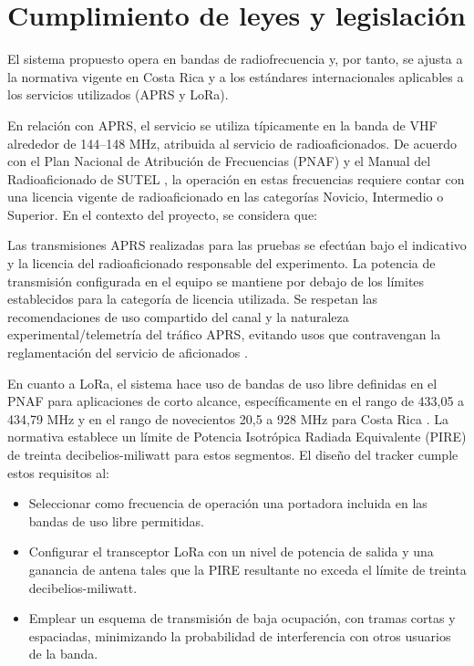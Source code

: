 \documentclass[journal]{IEEEtran}
\begin{document}
\section{Cumplimiento de leyes y legislación}

El sistema propuesto opera en bandas de radiofrecuencia y, por tanto, se ajusta a la normativa vigente en Costa Rica y a los estándares internacionales aplicables a los servicios utilizados (APRS y LoRa).

En relación con APRS, el servicio se utiliza típicamente en la banda de VHF alrededor de 144–148 MHz, atribuida al servicio de radioaficionados. De acuerdo con el Plan Nacional de Atribución de Frecuencias (PNAF) y el Manual del Radioaficionado de SUTEL \cite{sutel_manual_radioaficionados_2014}, la operación en estas frecuencias requiere contar con una licencia vigente de radioaficionado en las categorías Novicio, Intermedio o Superior. En el contexto del proyecto, se considera que:

Las transmisiones APRS realizadas para las pruebas se efectúan bajo el indicativo y la licencia del radioaficionado responsable del experimento.
La potencia de transmisión configurada en el equipo se mantiene por debajo de los límites establecidos para la categoría de licencia utilizada.
Se respetan las recomendaciones de uso compartido del canal y la naturaleza experimental/telemetría del tráfico APRS, evitando usos que contravengan la reglamentación del servicio de aficionados \cite{micitt_pnaf_2023}.

En cuanto a LoRa, el sistema hace uso de bandas de uso libre definidas en el PNAF para aplicaciones de corto alcance, específicamente en el rango de 433,05 a 434,79 MHz y en el rango de novecientos 20,5 a 928 MHz para Costa Rica \cite{sutel_manual_radioaficionados_2014}. La normativa establece un límite de Potencia Isotrópica Radiada Equivalente (PIRE) de treinta decibelios-miliwatt para estos segmentos. El diseño del tracker cumple estos requisitos al:

\begin{itemize}

\item Seleccionar como frecuencia de operación una portadora incluida en las bandas de uso libre permitidas.

\item Configurar el transceptor LoRa con un nivel de potencia de salida y una ganancia de antena tales que la PIRE resultante no exceda el límite de treinta decibelios-miliwatt.

\item Emplear un esquema de transmisión de baja ocupación, con tramas cortas y espaciadas, minimizando la probabilidad de interferencia con otros usuarios de la banda.

\end{itemize}
\end{document}
